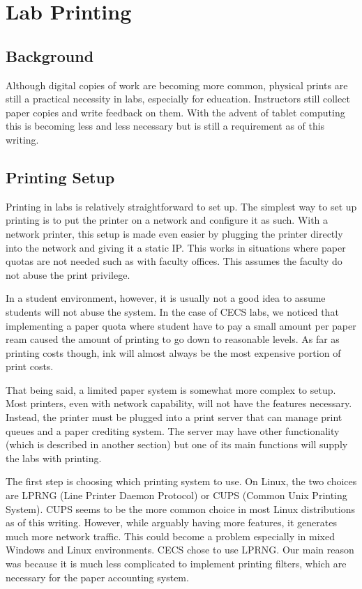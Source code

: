 \section{Lab Printing} \label{sec:lab_printing}
\subsection{Background}
Although digital copies of work are becoming more common, physical prints are still a practical necessity in labs, especially for education.  Instructors still collect paper copies and write feedback on them.  With the advent of tablet computing this is becoming less and less necessary but is still a requirement as of this writing.  
\subsection{Printing Setup}
Printing in labs is relatively straightforward to set up.  The simplest way to set up printing is to put the printer on a network and configure it as such.  With a network printer, this setup is made even easier by plugging the printer directly into the network and giving it a static IP.  This works in situations where paper quotas are not needed such as with faculty offices.  This assumes the faculty do not abuse the print privilege.  

In a student environment, however, it is usually not a good idea to assume students will not abuse the system.  In the case of CECS labs, we noticed that implementing a paper quota where student have to pay a small amount per paper ream caused the amount of printing to go down to reasonable levels.  As far as printing costs though, ink will almost always be the most expensive portion of print costs.  

That being said, a limited paper system is somewhat more complex to setup.  Most printers, even with network capability, will not have the features necessary.  Instead, the printer must be plugged into a print server that can manage print queues and a paper crediting system.  The server may have other functionality (which is described in another section) but one of its main functions will supply the labs with printing.  

The first step is choosing which printing system to use.  On Linux, the two choices are LPRNG (Line Printer Daemon Protocol) or CUPS (Common Unix Printing System).  CUPS seems to be the more common choice in most Linux distributions as of this writing.  However, while arguably having more features, it generates much more network traffic.  This could become a problem especially in mixed Windows and Linux environments.  CECS chose to use LPRNG.  Our main reason was because it is much less complicated to implement printing filters, which are necessary for the paper accounting system.

